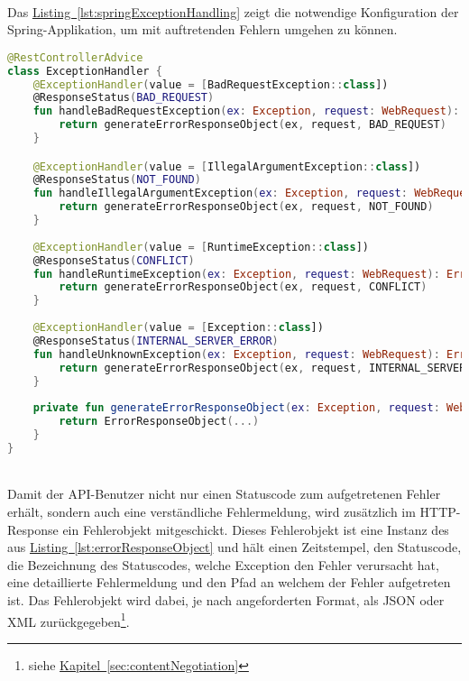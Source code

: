 \\
Das \hyperref[lst:springExceptionHandling]{Listing~\ref{lst:springExceptionHandling}} zeigt die notwendige Konfiguration der Spring-Applikation, um mit auftretenden Fehlern umgehen zu können.\\
\begin{lstlisting}[style=lstStyleFramed, language=Kotlin, caption={Spring-Konfiguration der Fehlerbehandlung}, label=lst:springExceptionHandling, float]
@RestControllerAdvice
class ExceptionHandler {
	@ExceptionHandler(value = [BadRequestException::class])
	@ResponseStatus(BAD_REQUEST)
	fun handleBadRequestException(ex: Exception, request: WebRequest): ErrorResponseObject {
		return generateErrorResponseObject(ex, request, BAD_REQUEST)
	}

	@ExceptionHandler(value = [IllegalArgumentException::class])
	@ResponseStatus(NOT_FOUND)
	fun handleIllegalArgumentException(ex: Exception, request: WebRequest): ErrorResponseObject {
		return generateErrorResponseObject(ex, request, NOT_FOUND)
	}
	
	@ExceptionHandler(value = [RuntimeException::class])
	@ResponseStatus(CONFLICT)
	fun handleRuntimeException(ex: Exception, request: WebRequest): ErrorResponseObject {
		return generateErrorResponseObject(ex, request, CONFLICT)
	}
	
	@ExceptionHandler(value = [Exception::class])
	@ResponseStatus(INTERNAL_SERVER_ERROR)
	fun handleUnknownException(ex: Exception, request: WebRequest): ErrorResponseObject {
		return generateErrorResponseObject(ex, request, INTERNAL_SERVER_ERROR)
	}
	
	private fun generateErrorResponseObject(ex: Exception, request: WebRequest, statusCode: HttpStatus): ErrorResponseObject {
		return ErrorResponseObject(...)
	}
}
\end{lstlisting}
\\
Damit der \gls{API}-Benutzer nicht nur einen Statuscode zum aufgetretenen Fehler erhält, sondern auch eine verständliche Fehlermeldung, wird zusätzlich im \gls{HTTP}-Response ein Fehlerobjekt mitgeschickt. Dieses Fehlerobjekt ist eine Instanz des  aus \hyperref[lst:errorResponseObject]{Listing~\ref{lst:errorResponseObject}} und hält einen Zeitstempel, den Statuscode, die Bezeichnung des Statuscodes, welche Exception den Fehler verursacht hat, eine detaillierte Fehlermeldung und den Pfad an welchem der Fehler aufgetreten ist. Das Fehlerobjekt wird dabei, je nach angeforderten Format, als \gls{JSON} oder \gls{XML} zurückgegeben\footnote{siehe \hyperref[sec:contentNegotiation]{Kapitel~\ref{sec:contentNegotiation}}}.
